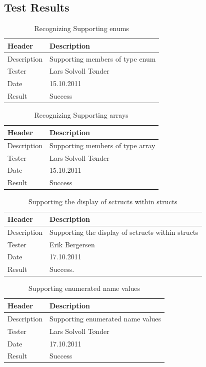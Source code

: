 \subsection{Test Results}
\begin{table}[!htb] \footnotesize \center
\caption{Recognizing Supporting enums \label{tab:sp2TID08}}
\begin{tabular}{l l}
	\toprule
	Header & Description \\
	\midrule
	Description &  Supporting members of type enum  \\
	Tester & Lars Solvoll Tønder \\
	Date & 15.10.2011 \\
	Result & Success\\
	\bottomrule
\end{tabular}
\end{table}

\begin{table}[!htb] \footnotesize \center
\caption{Recognizing Supporting arrays \label{tab:sp2TID09}}
\begin{tabular}{l l}
	\toprule
	Header & Description \\
	\midrule
	Description &  Supporting members of type array   \\
	Tester & Lars Solvoll Tønder \\
	Date & 15.10.2011 \\
	Result & Success\\
	\bottomrule
\end{tabular}
\end{table}

\begin{table}[!htb] \footnotesize \center
\caption{Supporting the display of sctructs within structs \label{tab:sp2TID10}}
\begin{tabular}{l l}
	\toprule
	Header & Description \\
	\midrule
	Description &  Supporting the display of sctructs within structs \\
	Tester & Erik Bergersen \\
	Date & 17.10.2011 \\
	Result & Success. \\
	\bottomrule
\end{tabular}
\end{table}

\begin{table}[!htb] \footnotesize \center
\caption{Supporting enumerated name values \label{tab:sp2TID11}}
\begin{tabular}{l l}
	\toprule
	Header & Description \\
	\midrule
	Description &  Supporting enumerated name values \\
	Tester & Lars Solvoll Tønder \\
	Date & 17.10.2011 \\
	Result & Success\\
	\bottomrule
\end{tabular}
\end{table}


